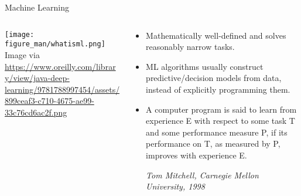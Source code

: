 
\begin{frame}{Machine Learning}

\begin{columns}
\begin{column}{0.65\textwidth}
\begin{center}
  \texttt{[image: figure\_man/whatisml.png]}\\[3ex]
  \tiny{Image via \url{https://www.oreilly.com/library/view/java-deep-learning/9781788997454/assets/899ceaf3-c710-4675-ae99-33c76cd6ac2f.png}}
\end{center}
\end{column}
\begin{column}{0.45\textwidth}
\begin{footnotesize}
\begin{itemize}
	\item Mathematically well-defined and solves reasonably narrow tasks.
	\item ML algorithms usually construct predictive/decision models from data, instead of explicitly programming them.
    \item A computer program is said to learn from experience E with respect to
  some task T and some performance measure P, if its performance on T, as 
  measured by P, improves with experience E. \\
  \begin{footnotesize}
  \emph{Tom Mitchell, Carnegie Mellon University, 1998}
  \end{footnotesize}
\end{itemize}
\end{footnotesize}
\end{column}
\end{columns}
  
\end{frame}

